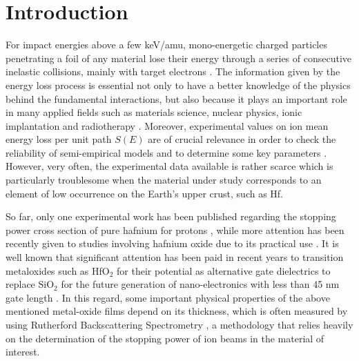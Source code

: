 \documentclass[aps,prb,reprint,groupedaddress]{revtex4-1}
\begin{document}
\section{Introduction}
\label{intro}

For impact energies above a few keV/amu, mono-energetic charged particles penetrating a foil of any material lose their energy through a series of consecutive inelastic collisions, mainly with target electrons \cite{Chu01,Sigmund}. The information given by the energy loss process is essential not only to have a better knowledge of the physics behind the fundamental interactions, but also because it plays an important role in many applied fields such as materials science, nuclear physics, ionic implantation and radiotherapy \cite{Sigmund,Schardt}. Moreover, experimental values on ion mean energy loss per unit path $S(E)$ are of crucial relevance in order to check the reliability of semi-empirical models and to determine some key parameters 
\cite{Diwan,Damache04,Damache02}. However, very often, the experimental data available is rather scarce which is particularly troublesome when the material under study corresponds to an element of low occurrence on the Earth's upper crust, such as Hf.

So far, only one experimental work has been published regarding the stopping power cross section of pure hafnium for protons \cite{Sirotinin}, while more attention has been recently given to studies involving hafnium oxide due to its practical use \cite{Abril,Behar,Primetzhofer}. It is well known that significant attention has been paid in recent years to transition metaloxides such as HfO$_2$ for their potential as alternative gate dielectrics to replace SiO$_2$ for the future generation of nano-electronics with less than 45 nm gate length \cite{Choi,Robertson}. In this regard, some important physical properties of the above mentioned metal-oxide films depend on its thickness, which is often measured by using Rutherford Backscattering Spectrometry \cite{Alfassi01, Tesmer01}, a methodology that relies heavily on the determination of the stopping power of ion beams in the material of interest.
\end{document}
